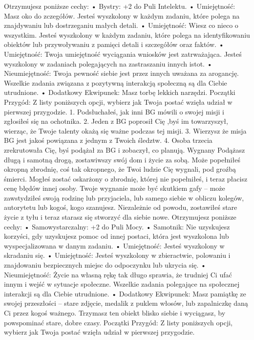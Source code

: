 Otrzymujesz poniższe cechy:
    • Bystry: +2 do Puli Intelektu.
    • Umiejętność: Masz oko do zczegółów. Jesteś wyszkolony w każdym zadaniu, które polega na znajdywaniu lub dostrzeganiu małych detali.
    • Umiejętność: Wiesz co nieco o wszystkim. Jesteś wyszkolony w każdym zadaniu, które polega na identyfikowaniu obiektów lub przywoływaniu z pamięci detali i szczegółów oraz faktów.
    • Umiejętność: Twoja umiejętność wyciągania wniosków jest zatrważająca. Jesteś wyszkolony w zadaniach polegających na zastraszaniu innych istot.
    • Nieumiejętność: Twoja pewność siebie jest przez innych uważana za arogancję. Wszelkie zadania związana z pozytywną interakcją społeczną są dla Ciebie utrudnione.
    • Dodatkowy Ekwipunek: Masz torbę lekkich narzędzi.
Początki Przygód: Z listy poniższych opcji, wybierz jak Twoja postać wzięła udział w pierwszej przygodzie.
1. Podsłuchałeś, jak inni BG mówili o swojej misji i zgłosiłeś się na ochotnika.
2. Jeden z BG poprosił Cię ,byś im towarzyszył, wierząc, że Twoje talenty okażą się ważne podczas tej misji. 
3. Wierzysz że misja BG jest jakoś powiązana z jednym z Twoich śledztw.
4. Osoba trzecia zrekrutowała Cię, byś podążał za BG i zobaczył, co planują.
Wygnany
Podążasz długą i samotną drogą, zostawiwszy swój dom i życie za sobą. Może popełniłeś okropną zbrodnię, coś tak okropnego, że Twoi ludzie Cię wygnali, pod groźbą śmierci. Mogłeś zostać oskarżony o zbrodnię, której nie popełniłeś, i teraz płacisz cenę błędów innej osoby. Twoje wygnanie może być skutkiem gafy – może zawstydziłeś swoją rodzinę lub przyjaciela, lub samego siebie w obliczu kolegów, autorytetu lub kogoś, kogo szanujesz. Niezależnie od powodu, zostawiłeś stare życie z tyłu i teraz starasz się stworzyć dla siebie nowe.
Otrzymujesz poniższe cechy:
    • Samowystarczalny: +2 do Puli Mocy.
    • Samotnik: Nie uzyskujesz korzyści, gdy uzyskujesz pomoc od innej postaci, która jest wyszkolona lub wyspecjalizowana w danym zadaniu.
    • Umiejętność: Jesteś wyszkolony w skradaniu się.
    • Umiejętność: Jesteś wyszkolony w zbieractwie, polowaniu i znajdowaniu bezpiecznych miejsc do odpoczynku lub ukrycia się.
    • Nieumiejętność: Życie na własną rękę tak długo sprawia, że trudniej Ci ufać innym i wejść w sytuacje społeczne. Wszelkie zadania polegające na społecznej interakcji są dla Ciebie utrudnione.
    • Dodatkowy Ekwipunek: Masz pamiątkę ze swojej przeszłości – stare zdjęcie, medalik z puklem włosów, lub zapalniczkę daną Ci przez kogoś ważnego. Trzymasz ten obiekt blisko siebie i wyciągasz, by powspominać stare, dobre czasy.
Początki Przygód: Z listy poniższych opcji, wybierz jak Twoja postać wzięła udział w pierwszej przygodzie.
